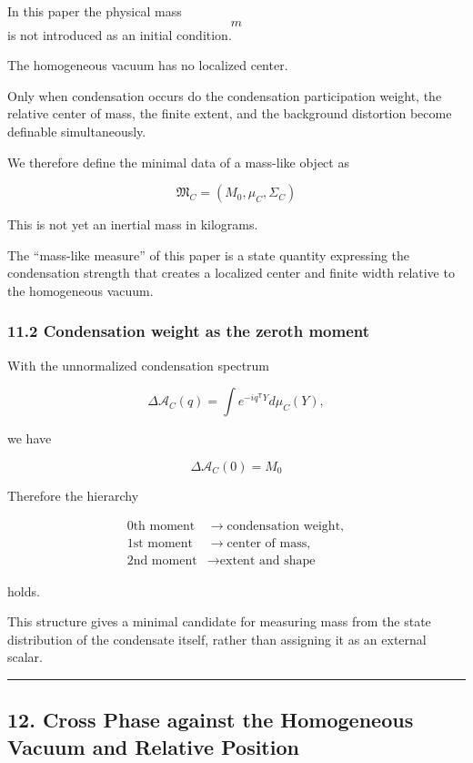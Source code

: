 \documentclass[
  a4paper,
]{article}
\begin{document}
In this paper the physical mass \[m\] is not introduced as an initial
condition.

The homogeneous vacuum has no localized center.

Only when condensation occurs do the condensation participation weight,
the relative center of mass, the finite extent, and the background
distortion become definable simultaneously.

We therefore define the minimal data of a mass-like object as

\[
\boxed{
\mathfrak M_C
=
\left(
M_0,
\mu_C,
\Sigma_C
\right)
}
\tag{32}
\]

This is not yet an inertial mass in kilograms.

The ``mass-like measure'' of this paper is a state quantity expressing
the condensation strength that creates a localized center and finite
width relative to the homogeneous vacuum.

\subsubsection{11.2 Condensation weight as the zeroth
moment}\label{condensation-weight-as-the-zeroth-moment}

With the unnormalized condensation spectrum

\[
\Delta\mathcal A_C(q)
=
\int
 e^{-iq^{\mathsf T}Y}
d\mu_C(Y),
\tag{33}
\]

we have

\[
\boxed{
\Delta\mathcal A_C(0)
=
M_0
}
\tag{34}
\]

Therefore the hierarchy

\[
\boxed{
\begin{aligned}
0\text{th moment}
&\longrightarrow
\text{condensation weight},\\
1\text{st moment}
&\longrightarrow
\text{center of mass},\\
2\text{nd moment}
&\longrightarrow
\text{extent and shape}
\end{aligned}
}
\tag{35}
\]

holds.

This structure gives a minimal candidate for measuring mass from the
state distribution of the condensate itself, rather than assigning it as
an external scalar.

\begin{center}\rule{0.5\linewidth}{0.5pt}\end{center}

\subsection{12. Cross Phase against the Homogeneous Vacuum and Relative
Position}\label{cross-phase-against-the-homogeneous-vacuum-and-relative-position}
\end{document}
